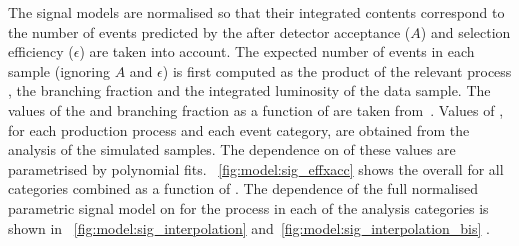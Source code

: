 The signal models are normalised so that their integrated contents correspond to the number of events predicted by the \SM after detector acceptance ($A$) and selection efficiency ($\epsilon$) are taken into account. The expected number of events in each sample (ignoring $A$ and $\epsilon$) is first computed as the product of the relevant process \crosssection, the \Hgg branching fraction and the integrated luminosity of the data sample. The values of the \crosssection\s and branching fraction as a function of \mH are taken from~\cite{LHCHXSWGYR4}. 
Values of \effxacc, for each production process and each event category, are obtained from the analysis of the simulated samples. The dependence on \mH of these values are parametrised by polynomial fits.
\Fig~\ref{fig:model:sig_effxacc} shows the overall \effxacc for all categories combined as a function of \mH.
The dependence of the full normalised parametric signal model on \mH for the \ggH process in each of the analysis categories is shown in \Fig\s~\ref{fig:model:sig_interpolation} and~\ref{fig:model:sig_interpolation_bis} . 

